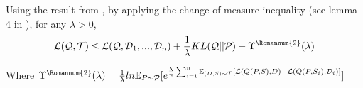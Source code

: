 \documentclass[letterpaper]{article}
\theoremstyle{definition}
\begin{document}
Using the result from \cite{Rothfuss2020}, by applying the change of measure inequality (see lemma 4 in \cite{Seldin2010}), for any $\lambda>0$,
$$\mathcal{L}(\mathcal{Q}, \mathcal{T})\leq \mathcal{L}(\mathcal{Q}, \mathcal{D}_1,...,\mathcal{D}_n) + \frac{1}{\lambda} KL(\mathcal{Q}||\mathcal{P})+\Upsilon^{\text{\Romannum{2}}}(\lambda)$$

Where $\Upsilon^{\text{\Romannum{2}}}(\lambda)=\frac{1}{\lambda}ln \mathbb{E}_{P\sim \mathcal{P}} [e^{\frac{\lambda}{n}\sum_{i=1}^{n}\mathbb{E}_{(D,S)\sim \mathcal{T}}[\mathcal{L}(Q(P,S),D)- \mathcal{L}(Q(P, S_i), \mathcal{D}_i)]}]$









\end{document}
